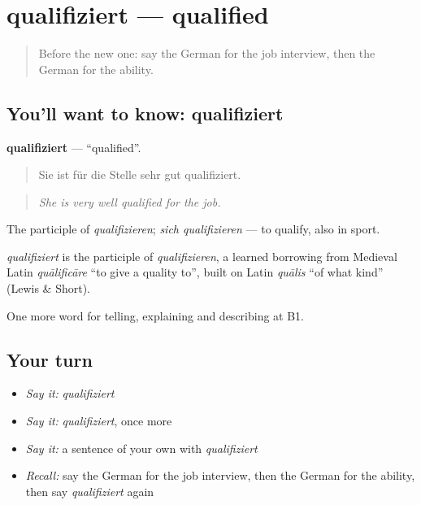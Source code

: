 \section[qualifiziert]{qualifiziert — qualified}

\label{lesson:GE-C349-qualifiziert}



\begin{quote}
Before the new one: say the German for the job interview, then the German for the ability.
\end{quote}

\subsection*{You'll want to know: qualifiziert}
\textbf{qualifiziert} — \textquotedblleft{}qualified\textquotedblright{}.

\begin{quote}
Sie ist für die Stelle sehr gut qualifiziert.
\end{quote}

\begin{quote}
\emph{She is very well qualified for the job.}
\end{quote}

The participle of \emph{qualifizieren}; \emph{sich qualifizieren} — to qualify, also in sport.

\begin{cousinweb}
\emph{qualifiziert} is the participle of \emph{qualifizieren}, a learned borrowing from Medieval Latin \emph{quālificāre} \textquotedblleft{}to give a quality to\textquotedblright{}, built on Latin \emph{quālis} \textquotedblleft{}of what kind\textquotedblright{} (Lewis \& Short).
\end{cousinweb}

\begin{grammarlens}[title={What you've built}]
One more word for telling, explaining and describing at B1.
\end{grammarlens}

\subsection*{Your turn}
\begin{itemize}
\raggedright
  \item \emph{Say it:} \emph{qualifiziert}
  \item \emph{Say it:} \emph{qualifiziert}, once more
  \item \emph{Say it:} a sentence of your own with \emph{qualifiziert}
  \item \emph{Recall:} say the German for the job interview, then the German for the ability, then say \emph{qualifiziert} again
\end{itemize}

